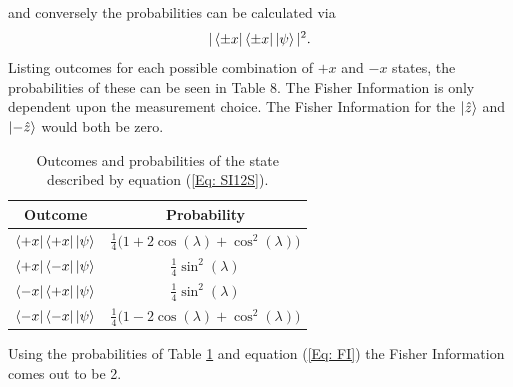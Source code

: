 \documentclass[twocolumn]{article}
\begin{document}
and conversely the probabilities can be calculated via
\begin{equation} \label{Eq: POMOS}
|\bra{\pm x}\bra{\pm x}\ket{\psi}|^2.
\end{equation}
Listing outcomes for each possible combination of $+x$ and $-x$ states, the probabilities of these can be seen in Table 8. The Fisher Information is only dependent upon the measurement choice. The Fisher Information for the $\ket{\hat{z}}$ and $\ket{-\hat{z}}$ would both be zero.
\newpage
\begin{table}[ht]
    \centering
    \begin{tabular}{|c|c|}
         \hline Outcome & Probability \\
         \hline $\bra{+x}\bra{+x}\ket{\psi}$ & $\frac{1}{4}\big(1+2\cos{(\lambda)}+\cos^2{(\lambda)}\big)$ \\
         \hline $\bra{+x}\bra{-x}\ket{\psi}$ & $\frac{1}{4}\sin^2{(\lambda)}$ \\
         \hline $\bra{-x}\bra{+x}\ket{\psi}$ & $\frac{1}{4}\sin^2{(\lambda)}$ \\
         \hline $\bra{-x}\bra{-x}\ket{\psi}$ & $\frac{1}{4}\big(1-2\cos{(\lambda)}+\cos^2{(\lambda)}\big)$ \\
         \hline
    \end{tabular}
    \caption{\footnotesize{Outcomes and probabilities of the state described by equation (\ref{Eq: SI12S}).}}
    \label{Tab: OAPOS}
\end{table}
\par \noindent
Using the probabilities of Table \ref{Tab: OAPOS} and equation (\ref{Eq: FI}) the Fisher Information comes out to be 2. 
\end{document}
